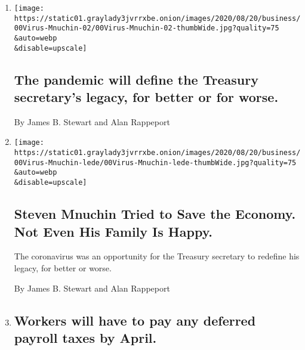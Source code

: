 \begin{enumerate}
\def\labelenumi{\arabic{enumi}.}
\item
  \href{/2020/08/31/business/the-pandemic-will-define-the-treasury-secretarys-legacy-for-better-or-for-worse.html}{}

  \texttt{[image: https://static01.graylady3jvrrxbe.onion/images/2020/08/20/business/00Virus-Mnuchin-02/00Virus-Mnuchin-02-thumbWide.jpg?quality=75\\\&auto=webp\\\&disable=upscale]}

  \hypertarget{the-pandemic-will-define-the-treasury-secretarys-legacy-for-better-or-for-worse}{%
  \subsection{The pandemic will define the Treasury secretary's legacy,
  for better or for
  worse.}\label{the-pandemic-will-define-the-treasury-secretarys-legacy-for-better-or-for-worse}}

  By James B. Stewart and Alan Rappeport
\item
  \href{/2020/08/30/business/steven-mnuchin-trump-economy.html}{}

  \texttt{[image: https://static01.graylady3jvrrxbe.onion/images/2020/08/20/business/00Virus-Mnuchin-lede/00Virus-Mnuchin-lede-thumbWide.jpg?quality=75\\\&auto=webp\\\&disable=upscale]}

  \hypertarget{steven-mnuchin-tried-to-save-the-economy-not-even-his-family-is-happy}{%
  \subsection{Steven Mnuchin Tried to Save the Economy. Not Even His
  Family Is
  Happy.}\label{steven-mnuchin-tried-to-save-the-economy-not-even-his-family-is-happy}}

  The coronavirus was an opportunity for the Treasury secretary to
  redefine his legacy, for better or worse.

  By James B. Stewart and Alan Rappeport
\item
  \href{/live/2020/08/28/business/stock-market-today-coronavirus/workers-will-have-to-pay-any-deferred-payroll-taxes-by-april}{}

  \hypertarget{workers-will-have-to-pay-any-deferred-payroll-taxes-by-april}{%
  \subsection{Workers will have to pay any deferred payroll taxes by
  April.}\label{workers-will-have-to-pay-any-deferred-payroll-taxes-by-april}}


\end{enumerate}
